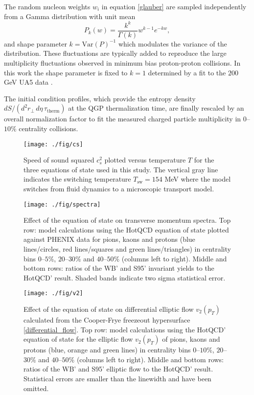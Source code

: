 \documentclass[aps,prc,reprint,amsmath,nofootinbib,superscriptaddress]{revtex4-1}
\begin{document}
The random nucleon weights $w_i$ in equation \eqref{glauber} are sampled independently from a Gamma distribution with unit mean
\begin{equation}
 P_k(w) = \frac{k^k}{\Gamma(k)} w^{k-1} e^{-k w},
\end{equation}
and shape parameter $k = \text{Var}(P)^{-1}$ which modulates the variance of the distribution. 
These fluctuations are typically added \cite{?} to reproduce the large multiplicity fluctuations observed in minimum bias proton-proton collisions. 
In this work the shape parameter is fixed to $k=1$ determined by a fit to the $200$ GeV UA5 data \cite{?}. 

The initial condition profiles, which provide the entropy density $dS/(d^2r_\perp\, d\eta\, \tau_\text{therm})$ at the QGP thermalization time, are finally 
rescaled by an overall normalization factor to fit the measured charged particle multiplicity in $0$--$10\%$ centrality collisions.

\begin{figure}
  \texttt{[image: ./fig/cs]}
  \caption{\label{fig:cs} Speed of sound squared $c_s^2$ plotted versus temperature $T$ for the three equations of state used in this study. The vertical
	   gray line indicates the switching temperature $T_\text{sw} = 154$ MeV where the model switches from fluid dynamics to a microscopic transport model.}
\end{figure}

\begin{figure*}[t]
  \texttt{[image: ./fig/spectra]}
  \caption{
    \label{fig:spectra} Effect of the equation of state on transverse momentum spectra. Top row: model calculations using the HotQCD equation of state plotted against 
    PHENIX data for pions, kaons and protons (blue lines/circles, red lines/squares and green lines/triangles) in centrality bins $0$--$5\%$, $20$--$30\%$ and $40$--$50\%$ 
    (columns left to right). Middle and bottom rows: ratios of the WB' and S95' invariant yields to the HotQCD' result. Shaded bands indicate two sigma statistical error. }
\end{figure*}

\begin{figure*}[t]
  \texttt{[image: ./fig/v2]}
  \caption{
    \label{fig:v2} Effect of the equation of state on differential elliptic flow $v_2(p_T)$ calculated from the Cooper-Frye freezeout hypersurface \eqref{differential_flow}.
    Top row: model calculations using the HotQCD' equation of state for the elliptic flow $v_2(p_T)$  of pions, kaons and protons (blue, orange and green lines) 
    in centrality bins $0$--$10\%$, $20$--$30\%$ and $40$--$50\%$ (columns left to right). Middle and bottom rows: ratios of the WB' and S95' elliptic flow to 
    the HotQCD' result. Statistical errors are smaller than the linewidth and have been omitted.
  }
\end{figure*}
\end{document}
